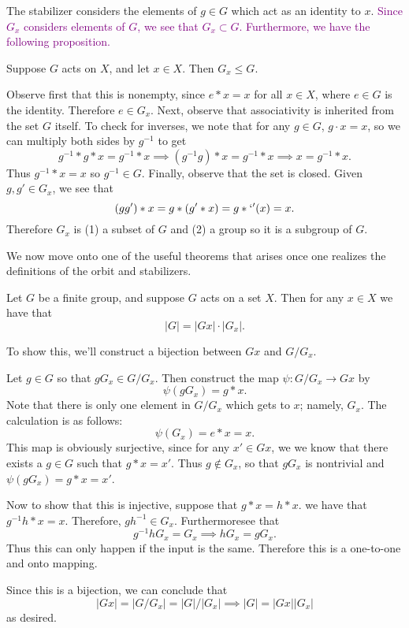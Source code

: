     The stabilizer considers the elements of $g \in G$ which act as an
    identity to $x$. \textcolor{purple}{Since $G_x$ considers elements
    of $G$, we see that $G_x \subset G$. Furthermore, we have the
    following proposition.}

    \begin{proposition}
        Suppose $G$ acts on $X$, and let $x \in X$. Then $G_x \le G$.
    \end{proposition}

    \begin{prf}
        Observe first that this is nonempty, since $e * x = x$ for
        all $x \in X$, where $e \in G$ is the identity. Therefore $e
        \in G_x$. Next, observe that associativity is inherited from
        the set $G$ itself. To check for inverses, we note that for any $g \in G$, $g \cdot x = x$, 
        so we can multiply both sides by $g^{-1}$ to get
        \[  
            g^{-1} * g * x = g^{-1} * x \implies (g^{-1}g) * x = g^{-1} * x 
            \implies x = g^{-1} * x.
        \]
        Thus $g^{-1} * x = x$ so $g^{-1} \in G$. Finally, observe
        that the set is closed. Given $g, g' \in G_x$, we see that 
        \[
            (gg') * x = g * (g' * x) = g *`' (x) = x.
        \]
        Therefore $G_x$ is (1) a subset of $G$ and (2) a group so it
        is a subgroup of $G$.

    \end{prf}
    We now move onto one of the useful theorems that arises once one
    realizes the definitions of the orbit and stabilizers.

    \begin{thm}
        Let $G$ be a finite group, and suppose $G$ acts on a set $X$.
        Then for any $x \in X$ we have that 
        \[
            |G| = |Gx| \cdot |G_x|.
        \]
    \end{thm}

    \begin{prf}
        To show this, we'll construct a bijection between $Gx$ and
        $G/G_x$. 

        Let $g \in G$ so that $gG_x \in G/G_x$. Then construct the map
        $\psi: G/G_x \to Gx$ by
        \[
            \psi(gG_x) = g * x.
        \]
        Note that there is only one element in $G/G_x$ which gets
       to $x$; namely, $G_x$. The calculation is as follows:
       \[
            \psi(G_x) = e * x = x.
       \]
       This map is obviously surjective, since for any $x' \in Gx$, we
        we know that there exists a $g \in G$ such that $g * x = x'$.
        Thus $g \not\in G_x$, so that $gG_x$ is nontrivial and
        $\psi(gG_x) = g * x = x'$.

        Now to show that this is injective, suppose that $g*x = h*x$.
     we have that $g^{-1}h * x = x$. Therefore, $gh^{-1} \in G_x$.
     Furthermoresee that 
     \[
         g^{-1}hG_x = G_x \implies hG_x = gG_x.
     \]
     Thus this can only happen if the input is the same. Therefore
     this is a one-to-one and onto mapping. 

     Since this is a bijection, we can conclude that 
     \[
        |Gx| = |G/G_x| = |G|/|G_x| \implies |G| = |Gx||G_x|    
     \]
     as desired.
    \end{prf}
    

